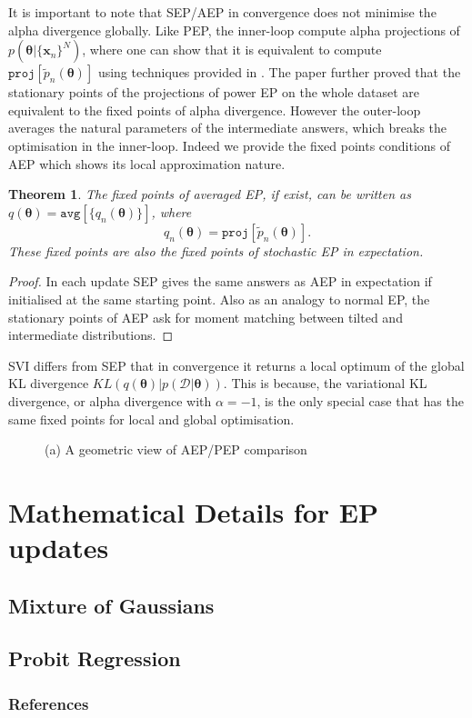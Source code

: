\documentclass{article} %
\newtheorem{theorem}{Theorem}
\begin{document}
It is important to note that SEP/AEP in convergence does not minimise the alpha divergence globally. Like PEP, the inner-loop compute alpha projections of $p(\bm{\theta} | \{\bm{x}_n\}^N)$, where one can show that it is equivalent to compute $\mathtt{proj}[\tilde{p}_n(\bm{\theta})]$ using techniques provided in \cite{minka:powerep}. The paper further proved that the stationary points of the projections of power EP on the whole dataset are equivalent to the fixed points of alpha divergence. However the outer-loop averages the natural parameters of the intermediate answers, which breaks the optimisation in the inner-loop. Indeed we provide the fixed points conditions of AEP which shows its local approximation nature.
%
\begin{theorem}
The fixed points of averaged EP, if exist, can be written as $q(\bm{\theta}) = \mathtt{avg}[\{q_n(\bm{\theta})\}]$, where
\begin{equation}
q_n(\bm{\theta}) = \mathtt{proj}[\tilde{p}_n(\bm{\theta})].
\label{eq:mm}
\end{equation}
These fixed points are also the fixed points of stochastic EP in expectation. 
\end{theorem}
\begin{proof}
In each update SEP gives the same answers as AEP in expectation if initialised at the same starting point. Also as an analogy to normal EP, the stationary points of AEP ask for moment matching between tilted and intermediate distributions. 
\end{proof}
%
SVI differs from SEP that in convergence it returns a local optimum of the global KL divergence $KL(q(\bm{\theta})|p(\mathcal{D}|\bm{\theta}))$. This is because, the variational KL divergence, or alpha divergence with $\alpha = -1$, is the only special case that has the same fixed points for local and global optimisation. 

\begin{figure}
\centering
\def\svgwidth{0.35\linewidth}
\subfigure[\label{fig:aep_vs_pep}]{
}
%
\caption{(a) A geometric view of AEP/PEP comparison}
\end{figure}

\section{Mathematical Details for EP updates}
\subsection{Mixture of Gaussians}

\subsection{Probit Regression}

\subsubsection*{References}
\renewcommand{\section}[2]{}


\end{document}
